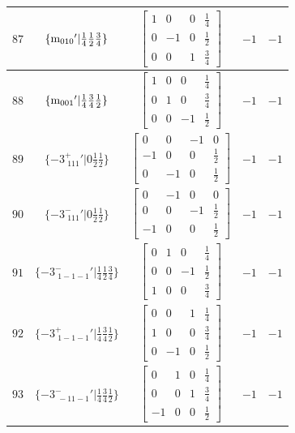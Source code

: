 \documentclass[fleqn,8pt]{jsarticle}
\begin{document}
\begin{longtable}{ccccc}
$ 87 $ & $ \{{\rm m}_{010}{}'|\frac{1}{4} \frac{1}{2} \frac{3}{4}\} $ & $ \begin{bmatrix} 1 & 0 & 0 & \frac{1}{4} \\ 0 & -1 & 0 & \frac{1}{2} \\ 0 & 0 & 1 & \frac{3}{4} \end{bmatrix} $ & $ -1 $ & $ -1 $ \\ \hline
$ 88 $ & $ \{{\rm m}_{001}{}'|\frac{1}{4} \frac{3}{4} \frac{1}{2}\} $ & $ \begin{bmatrix} 1 & 0 & 0 & \frac{1}{4} \\ 0 & 1 & 0 & \frac{3}{4} \\ 0 & 0 & -1 & \frac{1}{2} \end{bmatrix} $ & $ -1 $ & $ -1 $ \\ \hline
$ 89 $ & $ \{-3^{+}_{\,\,111}{}'|0 \frac{1}{2} \frac{1}{2}\} $ & $ \begin{bmatrix} 0 & 0 & -1 & 0 \\ -1 & 0 & 0 & \frac{1}{2} \\ 0 & -1 & 0 & \frac{1}{2} \end{bmatrix} $ & $ -1 $ & $ -1 $ \\ \hline
$ 90 $ & $ \{-3^{-}_{\,\,111}{}'|0 \frac{1}{2} \frac{1}{2}\} $ & $ \begin{bmatrix} 0 & -1 & 0 & 0 \\ 0 & 0 & -1 & \frac{1}{2} \\ -1 & 0 & 0 & \frac{1}{2} \end{bmatrix} $ & $ -1 $ & $ -1 $ \\ \hline
$ 91 $ & $ \{-3^{-}_{\,\,1-1-1}{}'|\frac{1}{4} \frac{1}{2} \frac{3}{4}\} $ & $ \begin{bmatrix} 0 & 1 & 0 & \frac{1}{4} \\ 0 & 0 & -1 & \frac{1}{2} \\ 1 & 0 & 0 & \frac{3}{4} \end{bmatrix} $ & $ -1 $ & $ -1 $ \\ \hline
$ 92 $ & $ \{-3^{+}_{\,\,1-1-1}{}'|\frac{1}{4} \frac{3}{4} \frac{1}{2}\} $ & $ \begin{bmatrix} 0 & 0 & 1 & \frac{1}{4} \\ 1 & 0 & 0 & \frac{3}{4} \\ 0 & -1 & 0 & \frac{1}{2} \end{bmatrix} $ & $ -1 $ & $ -1 $ \\ \hline
$ 93 $ & $ \{-3^{-}_{\,\,-11-1}{}'|\frac{1}{4} \frac{3}{4} \frac{1}{2}\} $ & $ \begin{bmatrix} 0 & 1 & 0 & \frac{1}{4} \\ 0 & 0 & 1 & \frac{3}{4} \\ -1 & 0 & 0 & \frac{1}{2} \end{bmatrix} $ & $ -1 $ & $ -1 $ \\ \hline

\end{longtable}
\end{document}
